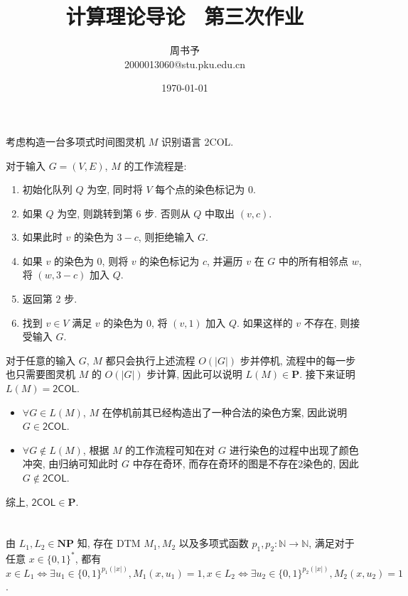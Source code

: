 \documentclass[8pt]{article}
\title{\heiti\zihao{1} 计算理论导论 \ 第三次作业}
\author{\kaishu\zihao{-3} 周书予\\2000013060@stu.pku.edu.cn}
\date{\today}
\theoremstyle{compact}
\begin{document}
\pagestyle{plain}



\maketitle

\section{}
考虑构造一台多项式时间图灵机 $M$ 识别语言 \textsf{2COL}.

对于输入 $G = (V, E)$, $M$ 的工作流程是:

\begin{enumerate}
	\item 初始化队列 $Q$ 为空, 同时将 $V$ 每个点的染色标记为 $0$.
	\item 如果 $Q$ 为空, 则跳转到第 $6$ 步. 否则从 $Q$ 中取出 $(v, c)$.
	\item 如果此时 $v$ 的染色为 $3 - c$, 则拒绝输入 $G$.
	\item 如果 $v$ 的染色为 $0$, 则将 $v$ 的染色标记为 $c$, 并遍历 $v$ 在 $G$ 中的所有相邻点 $w$, 将 $(w, 3 - c)$ 加入 $Q$.
	\item 返回第 $2$ 步.
	\item 找到 $v \in V$ 满足 $v$ 的染色为 $0$, 将 $(v, 1)$ 加入 $Q$. 如果这样的 $v$ 不存在, 则接受输入 $G$.
\end{enumerate}

对于任意的输入 $G$, $M$ 都只会执行上述流程 $O(|G|)$ 步并停机, 流程中的每一步也只需要图灵机 $M$ 的 $O(|G|)$ 步计算, 因此可以说明 $L(M) \in \mathbf P$. 接下来证明 $L(M) = \textsf{2COL}$.

\begin{itemize}
	\item $\forall G \in L(M)$, $M$ 在停机前其已经构造出了一种合法的染色方案, 因此说明 $G \in \textsf{2COL}$.
	\item $\forall G \notin L(M)$, 根据 $M$ 的工作流程可知在对 $G$ 进行染色的过程中出现了颜色冲突, 由归纳可知此时 $G$ 中存在奇环, 而存在奇环的图是不存在2染色的, 因此 $G \notin \textsf{2COL}$.
\end{itemize}

综上, $\textsf{2COL} \in \mathbf P$.

\section{}
由 $L_1, L_2 \in \textbf{NP}$ 知, 存在 DTM $M_1, M_2$ 以及多项式函数 $p_1, p_2: \mathbb N \to \mathbb N$, 满足对于任意 $x \in \{0, 1\}^*$, 都有 $x \in L_1 \Leftrightarrow \exists u_1 \in \{0, 1\}^{p_1(|x|)}, M_1(x, u_1) = 1, x \in L_2 \Leftrightarrow \exists u_2 \in \{0, 1\}^{p_2(|x|)}, M_2(x, u_2) = 1$.
\end{document}
